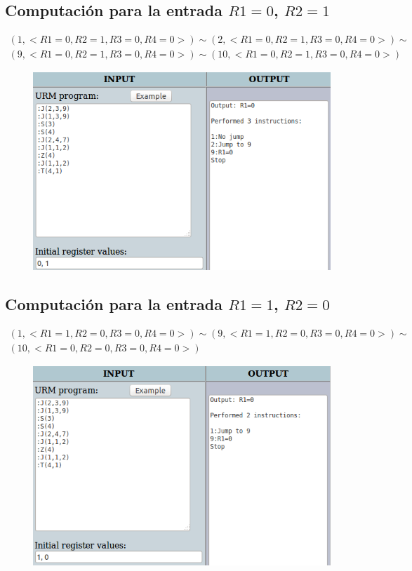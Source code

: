 	\subsection{Computación para la entrada $R1=0$, $R2=1$}
	\begin{equation*}\begin{gathered}
	(1, <R1=0, R2=1, R3=0, R4=0>) \sim (2, <R1=0, R2=1, R3=0, R4=0>) \sim\\
	(9, <R1=0, R2=1, R3=0, R4=0>) \sim (10, <R1=0, R2=1, R3=0, R4=0>)
	\end{gathered}\end{equation*}
	\begin{figure}[H]
  		\centering
  		\includegraphics[scale=0.5]{images/701.png}
  	\end{figure}
	\subsection{Computación para la entrada $R1=1$, $R2=0$}
	\begin{equation*}\begin{gathered}
	(1, <R1=1, R2=0, R3=0, R4=0>) \sim (9, <R1=1, R2=0, R3=0, R4=0>) \sim\\
	(10, <R1=0, R2=0, R3=0, R4=0>)
	\end{gathered}\end{equation*}
	\begin{figure}[H]
  		\centering
  		\includegraphics[scale=0.5]{images/710.png}
  	\end{figure}
